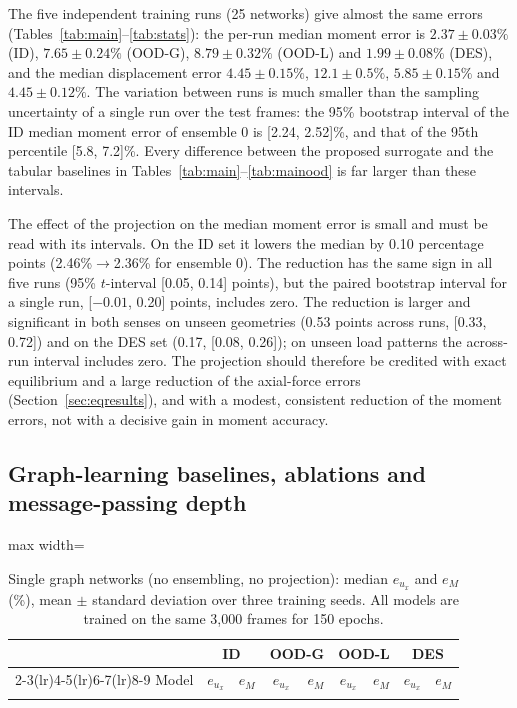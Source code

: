 The five independent training runs (25 networks) give almost the same errors (Tables~\ref{tab:main}--\ref{tab:stats}): the per-run median moment error is $2.37\pm0.03\%$ (ID), $7.65\pm0.24\%$ (OOD-G), $8.79\pm0.32\%$ (OOD-L) and $1.99\pm0.08\%$ (DES), and the median displacement error $4.45\pm0.15\%$, $12.1\pm0.5\%$, $5.85\pm0.15\%$ and $4.45\pm0.12\%$. The variation between runs is much smaller than the sampling uncertainty of a single run over the test frames: the 95\% bootstrap interval of the ID median moment error of ensemble 0 is [2.24, 2.52]\%, and that of the 95th percentile [5.8, 7.2]\%. Every difference between the proposed surrogate and the tabular baselines in Tables~\ref{tab:main}--\ref{tab:mainood} is far larger than these intervals.

The effect of the projection on the median moment error is small and must be read with its intervals. On the ID set it lowers the median by 0.10 percentage points (2.46\%$\to$2.36\% for ensemble 0). The reduction has the same sign in all five runs (95\% $t$-interval [0.05, 0.14] points), but the paired bootstrap interval for a single run, [$-0.01$, 0.20] points, includes zero. The reduction is larger and significant in both senses on unseen geometries (0.53 points across runs, [0.33, 0.72]) and on the DES set (0.17, [0.08, 0.26]); on unseen load patterns the across-run interval includes zero. The projection should therefore be credited with exact equilibrium and a large reduction of the axial-force errors (Section~\ref{sec:eqresults}), and with a modest, consistent reduction of the moment errors, not with a decisive gain in moment accuracy.

\subsection{Graph-learning baselines, ablations and message-passing depth}\label{sec:graphbaselines}\label{sec:ablation}

\begin{table}[p]
\centering
\caption{Single graph networks (no ensembling, no projection): median $e_{u_x}$ and $e_M$ (\%), mean $\pm$ standard deviation over three training seeds. All models are trained on the same 3{,}000 frames for 150 epochs.}\label{tab:graph}
\footnotesize
\setlength{\tabcolsep}{3pt}
\begin{adjustbox}{max width=\textwidth}
\begin{tabular}{lrrrrrrrr}
\toprule
& \multicolumn{2}{c}{ID} & \multicolumn{2}{c}{OOD-G} & \multicolumn{2}{c}{OOD-L} & \multicolumn{2}{c}{DES}\\
\cmidrule(lr){2-3}\cmidrule(lr){4-5}\cmidrule(lr){6-7}\cmidrule(lr){8-9}
Model & $e_{u_x}$ & $e_M$ & $e_{u_x}$ & $e_M$ & $e_{u_x}$ & $e_M$ & $e_{u_x}$ & $e_M$\\
\midrule
{}{tables/tab_graph.tex}
\bottomrule
\end{tabular}
\end{adjustbox}
\end{table}

